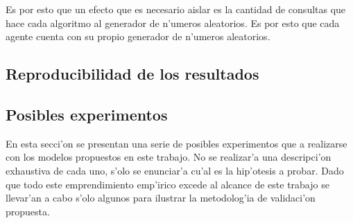 Es por esto que un efecto que es necesario aislar es la cantidad de consultas que hace cada algoritmo al
generador de n'umeros aleatorios. Es por esto que cada agente cuenta con su propio generador de n'umeros aleatorios.

\subsection{Reproducibilidad de los resultados}

\subsection{Posibles experimentos}
En esta secci'on se presentan una serie de posibles experimentos que a realizarse con los modelos propuestos en este trabajo. 
No se realizar'a una descripci'on exhaustiva de cada uno, s'olo se enunciar'a cu'al es la hip'otesis a probar.
Dado que todo este emprendimiento emp'irico excede al alcance de este trabajo se llevar'an a cabo s'olo algunos 
para ilustrar la metodolog'ia de validaci'on propuesta.

